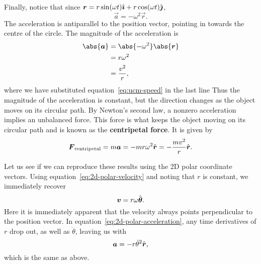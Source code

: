 \documentclass[../classical_mechanics.tex]{subfiles}
\begin{document}
        Finally, notice that since $\boldsymbol{r}=r\sin(\omega t)\hat{\boldsymbol{\imath}}+r\cos(\omega t)\hat{\boldsymbol{\jmath}}$,
        \begin{equation}
            \vec{a}=-\omega^2\vec{r}.
        \end{equation}
        The acceleration is antiparallel to the position vector, pointing in towards the centre of the circle.
        The magnitude of the acceleration is
        \begin{align}
            \abs{\vec{a}}&=\abs{-\omega^2}\abs{\vec{r}}\\
            &=r\omega^2\\
            &=\frac{v^2}{r},
        \end{align}
        where we have substituted equation~\ref{eq:ucm-speed} in the last line
        Thus the magnitude of the acceleration is constant, but the direction changes as the object moves on its circular path.
        By Newton's second law, a nonzero acceleration implies an unbalanced force.
        This force is what keeps the object moving on its circular path and is known as the \textbf{centripetal force}.
        It is given by
        \begin{equation}
            \boldsymbol{F}_\text{centripetal}=m\boldsymbol{a}=-mr\omega^2\hat{\boldsymbol{r}}=-\frac{mv^2}{r}\hat{\boldsymbol{r}}.
        \end{equation}

        Let us see if we can reproduce these results using the 2D polar coordinate vectors.
        Using equation~\ref{eq:2d-polar-velocity} and noting that $r$ is constant, we immediately recover
        \begin{equation}
            \boldsymbol{v}=r\omega\hat{\boldsymbol{\theta}}.
        \end{equation}
        Here it is immediately apparent that the velocity always points perpendicular to the position vector.
        In equation~\ref{eq:2d-polar-acceleration}, any time derivatives of $r$ drop out, as well as $\ddot{\theta}$, leaving us with
        \begin{equation}
            \boldsymbol{a}=-r\dot{\theta}^2\hat{\boldsymbol{r}},
        \end{equation}
        which is the same as above.       
        
\end{document}
